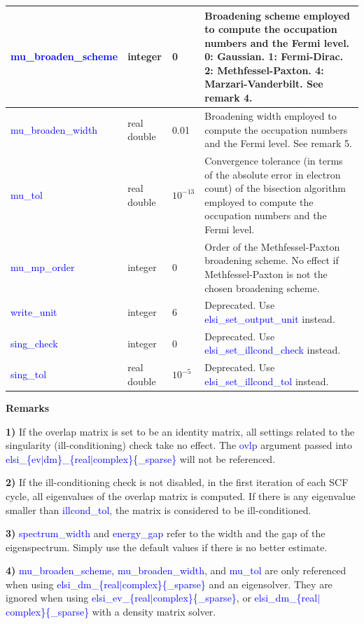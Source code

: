\documentclass{report}
\newcommand{\tcb}[1]{\textcolor{blue}{#1}}
\begin{document}
\begin{longtable}[]{|p{30mm}|p{20mm}|p{15mm}|p{100mm}|}
\hline
\tcb{mu\_broaden\_scheme} & integer     & 0           & Broadening scheme employed to compute the occupation numbers and the Fermi level. 0: Gaussian. 1: Fermi-Dirac. 2: Methfessel-Paxton. 4: Marzari-Vanderbilt. See remark 4.\\
\hline
\tcb{mu\_broaden\_width}  & real double & 0.01        & Broadening width employed to compute the occupation numbers and the Fermi level. See remark 5.\\
\hline
\tcb{mu\_tol}             & real double & $10^{-13}$  & Convergence tolerance (in terms of the absolute error in electron count) of the bisection algorithm employed to compute the occupation numbers and the Fermi level.\\
\hline
\tcb{mu\_mp\_order}       & integer     & 0           & Order of the Methfessel-Paxton broadening scheme. No effect if Methfessel-Paxton is not the chosen broadening scheme.\\
\hline
\tcb{write\_unit}         & integer     & 6           & Deprecated. Use \tcb{elsi\_set\_output\_unit} instead.\\
\hline
\tcb{sing\_check}         & integer     & 0           & Deprecated. Use \tcb{elsi\_set\_illcond\_check} instead.\\
\hline
\tcb{sing\_tol}           & real double & $10^{-5}$   & Deprecated. Use \tcb{elsi\_set\_illcond\_tol} instead.\\
\hline
\end{longtable}

\textbf{Remarks}

\textbf{1)} If the overlap matrix is set to be an identity matrix, all settings related to the singularity (ill-conditioning) check take no effect. The \tcb{ovlp} argument passed into \tcb{elsi\_\{ev$\vert$dm\}\_\{real$\vert$complex\}\{\_sparse\}} will not be referenced.

\textbf{2)} If the ill-conditioning check is not disabled, in the first iteration of each SCF cycle, all eigenvalues of the overlap matrix is computed. If there is any eigenvalue smaller than \tcb{illcond\_tol}, the matrix is considered to be ill-conditioned.

\textbf{3)} \tcb{spectrum\_width} and \tcb{energy\_gap} refer to the width and the gap of the eigenspectrum. Simply use the default values if there is no better estimate.

\textbf{4)} \tcb{mu\_broaden\_scheme}, \tcb{mu\_broaden\_width}, and  \tcb{mu\_tol} are only referenced when using \tcb{elsi\_dm\_\{real$\vert$complex\}\{\_sparse\}} and an eigensolver. They are ignored when using \tcb{elsi\_ev\_\{real$\vert$complex\}\{\_sparse\}}, or \tcb{elsi\_dm\_\{real$\vert$complex\}\{\_sparse\}} with a density matrix solver.
\end{document}
